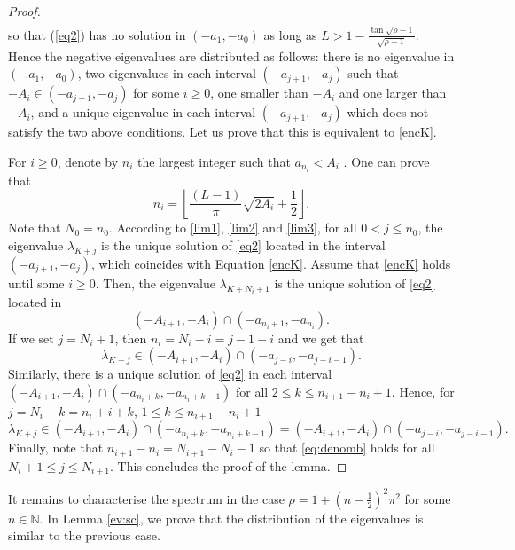 \documentclass[11pt]{article}
\theoremstyle{plain}
\begin{document}
\begin{proof}
\begin{eqnarray}
\end{eqnarray}
so that (\ref{eq2}) has no solution in $(-a_1,-a_0)$ as long as $L>1-\frac{\tan{\sqrt{\rho-1}}}{\sqrt{\rho-1}}$. Hence the negative eigenvalues are distributed as follows: there is no eigenvalue in $(-a_1,-a_0)$,  two eigenvalues in each interval $(-a_{j+1},-a_j)$ such that $-A_i\in (-a_{j+1},-a_j)$ for some $i\geqslant 0$, one smaller than $-A_i$ and one larger than $-A_i$, and a unique eigenvalue in each interval $(-a_{j+1},-a_j)$ which does not satisfy the two above conditions. Let us prove that this is equivalent to \eqref{encK}.

For  $i\geqslant 0$, denote by $n_i$ the largest integer such that $a_{n_i}<A_i$ . One can prove that\begin{equation*}
n_i=\left\lfloor \frac{(L-1)}{\pi}\sqrt{2A_i}+\frac{1}{2}\right\rfloor.
\end{equation*}
Note that $N_0=n_0$. According to \eqref{lim1}, \eqref{lim2} and \eqref{lim3}, for all $0< j\leqslant n_0$, the eigenvalue $\lambda_{K+j}$ is the unique solution of \eqref{eq2} located in the interval $(-a_{j+1},-a_j)$,  which coincides with Equation \eqref{encK}. Assume that \eqref{encK} holds until some $i\geqslant 0$. Then, the eigenvalue $\lambda_{K+N_i+1}$ is the unique solution of \eqref{eq2} located in 
\begin{equation*}
(-A_{i+1},-A_i)\cap(-a_{n_i+1},-a_{n_i}).
\end{equation*}
If we set $j=N_i+1$, then $n_i=N_i-i=j-1-i$ and we get that 
\begin{equation*}
\lambda_{K+j}\in(-A_{i+1},-A_i)\cap(-a_{j-i},-a_{j-i-1}).
\end{equation*}
Similarly, there is a  unique solution of \eqref{eq2} in each interval $(-A_{i+1},-A_i)\cap(-a_{n_i+k},-a_{n_i+k-1})$ for all $2\leqslant k\leqslant n_{i+1}-n_i+1$. Hence, for $j=N_i+k=n_i+i+k$, $1\leqslant k\leqslant n_{i+1}-n_i+1$
\begin{equation}\label{eq:denomb}
\lambda_{K+j}\in(-A_{i+1},-A_i)\cap (-a_{n_i+k}, -a_{n_i+k-1})= (-A_{i+1},-A_i)\cap (-a_{j-i}, -a_{j-i-1}).
\end{equation}
Finally, note that $n_{i+1}-n_i=N_{i+1}-N_i-1$ so that \eqref{eq:denomb} holds for all $N_i+1 \leqslant j\leqslant N_{i+1}.$ This concludes the proof of the lemma.
\end{proof}
It remains to characterise the spectrum in the case $\rho=1+\left(n-\frac{1}{2}\right)^2\pi^2$ for some $n\in\mathbb{N}$. In Lemma \ref{ev:sc}, we prove that the distribution of the eigenvalues is similar to the previous case. 
\end{document}

